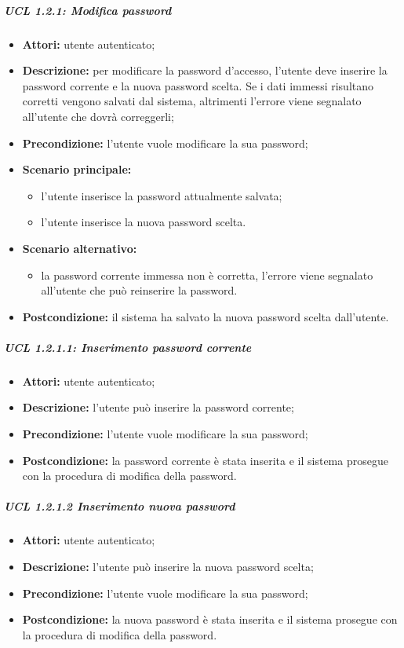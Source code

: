 \subparagraph{UCL 1.2.1: Modifica password}
\begin{itemize}
	\item \textbf{Attori:}  utente autenticato;
	\item \textbf{Descrizione:} per modificare la password d'accesso, l'utente deve inserire la password corrente e la nuova password scelta. Se i dati immessi risultano corretti vengono salvati dal sistema, altrimenti l'errore viene segnalato all'utente che dovrà correggerli;
	\item \textbf{Precondizione:} l'utente vuole modificare la sua password;
	\item \textbf{Scenario principale:}
	\begin{itemize}
		\item l'utente inserisce la password attualmente salvata;
		\item l'utente inserisce la nuova password scelta.
	\end{itemize}
	\item \textbf{Scenario alternativo:}
	\begin{itemize}
		\item la password corrente immessa non è corretta, l'errore viene segnalato all'utente che può reinserire la password.
	\end{itemize}
	\item \textbf{Postcondizione:} il sistema ha salvato la nuova password scelta dall'utente.
\end{itemize}

\subparagraph{UCL 1.2.1.1: Inserimento password corrente}
\begin{itemize}
	\item \textbf{Attori:} utente autenticato;
	\item \textbf{Descrizione:} l'utente può inserire la password corrente;
	\item \textbf{Precondizione:} l'utente vuole modificare la sua password;
	\item \textbf{Postcondizione:} la password corrente è stata inserita e il sistema prosegue con la procedura di modifica della password.
\end{itemize}

\subparagraph{UCL 1.2.1.2 Inserimento nuova password}
\begin{itemize}
	\item \textbf{Attori: } utente autenticato;
	\item \textbf{Descrizione:} l'utente può inserire la nuova password scelta;
	\item \textbf{Precondizione:} l'utente vuole modificare la sua password;
	\item \textbf{Postcondizione:} la nuova password è stata inserita e il sistema prosegue con la procedura di modifica della password.
\end{itemize}

